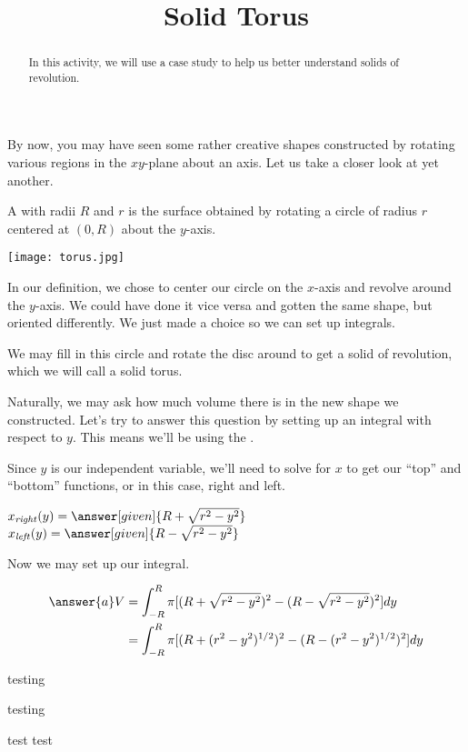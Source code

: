 \documentclass{ximera}
\title{Solid Torus}
\begin{document}
\begin{abstract}
In this activity, we will use a case study to help us better understand solids of revolution.
\end{abstract}
\maketitle

By now, you may have seen some rather creative shapes constructed by rotating various regions in the $xy$-plane about an axis. Let us take a closer look at yet another.
\begin{definition}
	A  with radii $R$ and $r$ is the surface obtained by rotating a circle of radius $r$ centered at $(0,R)$ about the $y$-axis.
\end{definition}

\begin{image}
	\label{torus}
	\texttt{[image: torus.jpg]}
\end{image}

\begin{remark}
	In our definition, we chose to center our circle on the $x$-axis and revolve around the $y$-axis. We could have done it vice versa and gotten the same shape, but oriented differently. We just made a choice so we can set up integrals.
\end{remark} 

We may fill in this circle and rotate the disc around to get a solid of revolution, which we will call a solid torus.

\begin{exercise}
	Naturally, we may ask how much volume there is in the new shape we constructed. Let's try to answer this question by setting up an integral with respect to $y$. This means we'll be using the  .
	
	Since $y$ is our independent variable, we'll need to solve for $x$ to get our ``top'' and ``bottom'' functions, or in this case, right and left.
	
	$x_{\mathit{right}}(y) = \answer[given]{R+\sqrt{r^2-y^2}}$
	$x_{\mathit{left}}(y) = \answer[given]{R-\sqrt{r^2-y^2}}$
	
	Now we may set up our integral.
	 \begin{prompt}
	\begin{align*}
		\answer{a}
		V  &= \int_{-R}^{R} \pi [ (R+\sqrt{r^2-y^2})^{2}-(R-\sqrt{r^2-y^2})^{2}] dy \\
		&= \int_{-R}^{R} \pi [ (R+(r^2-y^2)^{1/2})^{2}-(R-(r^2-y^2)^{1/2})^{2}] dy
	\end{align*}
	\begin{prompt}
		
		testing
	\end{prompt}
	testing
	\end{prompt}
	test test
\end{exercise}
\end{document}
